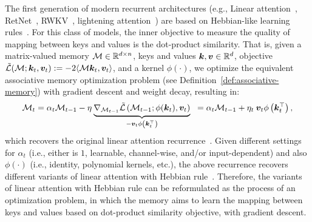 { The first generation of modern recurrent architectures (e.g., Linear attention~\citep{katharopoulos2020transformers}, RetNet~\citep{sun2023retentive}, RWKV~\citep{peng2023rwkv}, lightening attention~\citep{li2025minimax}) are based on Hebbian-like learning rules~\citep{hebb2005organization}. For this class of models, the inner objective to measure the quality of mapping between keys and values is the dot-product similarity. That is, given a matrix-valued memory $\mathcal{M} \in \mathbb{R}^{d \times n}$, keys and values $\boldsymbol{k}, \boldsymbol{v} \in \mathbb{R}^{d}$, objective $\tilde{\mathcal{L}}(\mathcal{M}; \boldsymbol{k}_t, \boldsymbol{v}_t) := -2 \langle \mathcal{M} \boldsymbol{k}_t, \boldsymbol{v}_t \rangle $, and a kernel $\phi(\cdot)$, we optimize the equivalent associative memory optimization problem (see Definition~\ref{def:associative-memory}) with gradient descent and weight decay, resulting in:
\begin{align}\label{eq:hebb-rule}
    \mathcal{M}_t = \alpha_t \mathcal{M}_{t-1} - \eta \: \underset{-\boldsymbol{v}_t \phi\left(\boldsymbol{k}_t^{\top} \right)}{\underbrace{\nabla_{\mathcal{M}_{t-1}} \tilde{\mathcal{L}}\left( \mathcal{M}_{t-1}; \phi(\boldsymbol{k}_t), \boldsymbol{v}_t \right)}} \ \: = \alpha_t \mathcal{M}_{t-1} + \eta_t \: \boldsymbol{v}_t \phi \left(\boldsymbol{k}_t^{\top} \right),
\end{align}
which recovers the original linear attention recurrence~\citep{katharopoulos2020transformers}. Given different settings for $\alpha_t$ (i.e., either is $1$, learnable, channel-wise, and/or input-dependent) and also $\phi(\cdot)$ (i.e., identity, polynomial kernels, etc.), the above recurrence recovers different variants of linear attention with Hebbian rule~\citep{katharopoulos2020transformers, polysketchformer-kacham2024, arora2024simple, sun2023retentive, peng2024eagle, beck2024xlstm}. Therefore, the variants of linear attention with Hebbian rule can be reformulated as the process of an optimization problem, in which the memory aims to learn the mapping between keys and values based on dot-product similarity objective, with gradient descent. 


}
